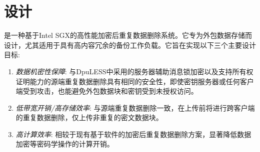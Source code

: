 \section{\sysnameS 设计}
\label{sec:sgxdedup-design}


\sysnameS 是一种基于Intel SGX的高性能加密后重复数据删除系统。它专为外包数据存储而设计，尤其适用于具有高内容冗余的备份工作负载。它旨在实现以下三个主要设计目标:
\begin{enumerate}[leftmargin=*]
    \item \textit{数据机密性保障}: 与DpuLESS\cite{bellare2013DupLESS}中采用的服务器辅助消息锁加密以及支持所有权证明\cite{halevi11}能力的源端重复数据删除具有相同的安全性，即使密钥服务器或任何客户端受到攻击，\sysnameS 也能避免外包数据块和密钥受到未授权访问。
    \item \textit{低带宽开销/高存储效率}: 与源端重复数据删除一致，\sysnameS 在上传前将进行跨客户端的重复数据删除，仅上传非重复的密文数据块。
    \item \textit{高计算效率}: 相较于现有基于软件的加密后重复数据删除方案，\sysnameS 显著降低数据加密等密码学操作的计算开销。
\end{enumerate}

